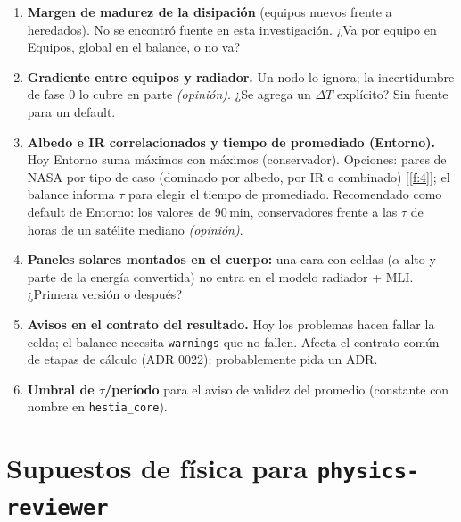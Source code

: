 \documentclass[11pt,a4paper]{article}
\newcommand{\code}[1]{\texttt{#1}}
\newcommand{\op}[1]{\textcolor{opinion}{\textit{(#1)}}}
\newcommand{\f}[1]{\ref{f:#1}}
\begin{document}
\begin{enumerate}
  \item \textbf{Margen de madurez de la disipación} (equipos nuevos frente a heredados). No se encontró fuente en esta investigación. ¿Va por equipo en Equipos, global en el balance, o no va?
  \item \textbf{Gradiente entre equipos y radiador.} Un nodo lo ignora; la incertidumbre de fase 0 lo cubre en parte \op{opinión}. ¿Se agrega un $\Delta T$ explícito? Sin fuente para un default.
  \item \textbf{Albedo e IR correlacionados y tiempo de promediado (Entorno).} Hoy Entorno suma máximos con máximos (conservador). Opciones: pares de NASA por tipo de caso (dominado por albedo, por IR o combinado) [\f{4}]; el balance informa $\tau$ para elegir el tiempo de promediado. Recomendado como default de Entorno: los valores de 90\,min, conservadores frente a las $\tau$ de horas de un satélite mediano \op{opinión}.
  \item \textbf{Paneles solares montados en el cuerpo:} una cara con celdas ($\alpha$ alto y parte de la energía convertida) no entra en el modelo radiador + MLI. ¿Primera versión o después?
  \item \textbf{Avisos en el contrato del resultado.} Hoy los problemas hacen fallar la celda; el balance necesita \code{warnings} que no fallen. Afecta el contrato común de etapas de cálculo (ADR 0022): probablemente pida un ADR.
  \item \textbf{Umbral de $\tau$/período} para el aviso de validez del promedio (constante con nombre en \code{hestia\_core}).
\end{enumerate}

\section{Supuestos de física para \code{physics-reviewer}}\label{sec:supuestos}
\end{document}
